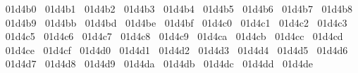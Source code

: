 {  ^^^^^^01d4b0%
  ^^^^^^01d4b1%
  ^^^^^^01d4b2%
  ^^^^^^01d4b3%
  ^^^^^^01d4b4%
  ^^^^^^01d4b5%
  ^^^^^^01d4b6%
  ^^^^^^01d4b7%
  ^^^^^^01d4b8%
  ^^^^^^01d4b9%
  ^^^^^^01d4bb%
  ^^^^^^01d4bd%
  ^^^^^^01d4be%
  ^^^^^^01d4bf%
  ^^^^^^01d4c0%
  ^^^^^^01d4c1%
  ^^^^^^01d4c2%
  ^^^^^^01d4c3%
  ^^^^^^01d4c5%
  ^^^^^^01d4c6%
  ^^^^^^01d4c7%
  ^^^^^^01d4c8%
  ^^^^^^01d4c9%
  ^^^^^^01d4ca%
  ^^^^^^01d4cb%
  ^^^^^^01d4cc%
  ^^^^^^01d4cd%
  ^^^^^^01d4ce%
  ^^^^^^01d4cf%
  ^^^^^^01d4d0%
  ^^^^^^01d4d1%
  ^^^^^^01d4d2%
  ^^^^^^01d4d3%
  ^^^^^^01d4d4%
  ^^^^^^01d4d5%
  ^^^^^^01d4d6%
  ^^^^^^01d4d7%
  ^^^^^^01d4d8%
  ^^^^^^01d4d9%
  ^^^^^^01d4da%
  ^^^^^^01d4db%
  ^^^^^^01d4dc%
  ^^^^^^01d4dd%
  ^^^^^^01d4de%
}
